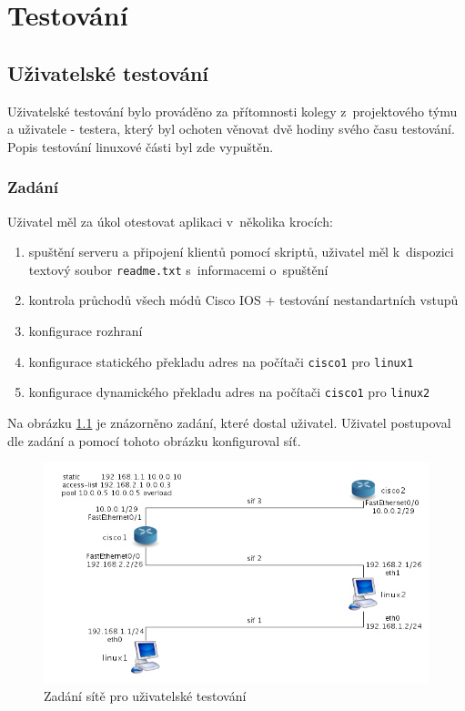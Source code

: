 \chapter{Testování}


\section{Uživatelské testování}
Uživatelské testování bylo prováděno za přítomnosti kolegy z~projektového týmu a uživatele - testera, který byl ochoten věnovat dvě hodiny svého času testování. Popis testování linuxové části byl zde vypuštěn.

\subsection{Zadání}
Uživatel měl za úkol otestovat aplikaci v~několika krocích:
\begin{enumerate}
 \item spuštění serveru a připojení klientů pomocí skriptů, uživatel měl k~dispozici textový soubor \verb|readme.txt| s~informacemi o~spuštění
 \item kontrola průchodů všech módů Cisco IOS + testování nestandartních vstupů
 \item konfigurace rozhraní
 \item konfigurace statického překladu adres na počítači \verb|cisco1| pro \verb|linux1|
 \item konfigurace dynamického překladu adres na počítači \verb|cisco1| pro \verb|linux2|
\end{enumerate}

Na obrázku \ref{fig:testovani} je znázorněno zadání, které dostal uživatel. Uživatel postupoval dle zadání a pomocí tohoto obrázku konfiguroval síť.

\begin{figure}[h]
\begin{center}
\includegraphics[width=15cm]{figures/testovani}
\caption{Zadání sítě pro uživatelské testování}
\label{fig:testovani}
\end{center}
\end{figure}


